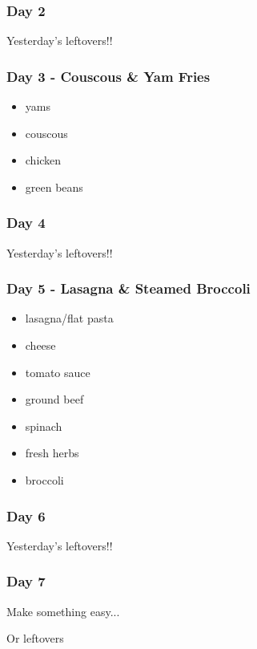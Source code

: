 \documentclass[11pt, a4paper]{article}
\begin{document}
\subsubsection{Day 2}
\vspace{1pc}
Yesterday's leftovers!!

\subsubsection{Day 3 - Couscous \& Yam Fries}
\vspace{1pc}
\begin{itemize}
\item yams
\item couscous
\item chicken 
\item green beans
\end{itemize}

\subsubsection{Day 4}
\vspace{1pc}
Yesterday's leftovers!!

\subsubsection{Day 5 - Lasagna \& Steamed Broccoli}
\vspace{1pc}
\begin{itemize}
\item lasagna/flat pasta
\item cheese
\item tomato sauce
\item ground beef
\item spinach
\item fresh herbs
\item broccoli
\end{itemize}

\subsubsection{Day 6}
\vspace{1pc}
Yesterday's leftovers!!

\subsubsection{Day 7}
\vspace{1pc}
\noindent Make something easy...
\par
Or leftovers
\end{document}
